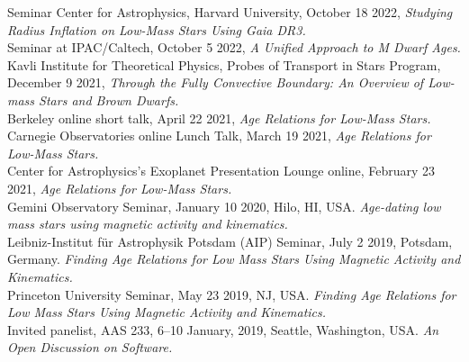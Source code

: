 \documentclass[10pt]{cv}
\begin{document}
\begin{llist}
Seminar Center for Astrophysics, Harvard University, October 18 2022, \textit{Studying Radius Inflation on Low-Mass Stars Using Gaia DR3.}\\
Seminar at IPAC/Caltech, October 5 2022, \textit{A Unified Approach to M Dwarf Ages.}\\
Kavli Institute for Theoretical Physics, Probes of Transport in Stars Program, December 9 2021, \textit{Through the Fully Convective Boundary: An Overview of Low-mass Stars and Brown Dwarfs.}\\
Berkeley online short talk, April 22 2021, \textit{Age Relations for Low-Mass Stars.}\\
Carnegie Observatories online Lunch Talk, March 19 2021, \textit{Age Relations for Low-Mass Stars.}\\
Center for Astrophysics's Exoplanet Presentation Lounge online, February 23 2021, \textit{Age Relations for Low-Mass Stars.}\\ 
Gemini Observatory Seminar, January 10 2020, Hilo, HI, USA. \textit{Age-dating low mass stars using magnetic activity and kinematics.}\\
Leibniz-Institut f\"{u}r Astrophysik Potsdam (AIP) Seminar, July 2 2019, Potsdam, Germany. \textit{Finding Age Relations for Low Mass Stars Using Magnetic Activity and Kinematics.}\\
Princeton University Seminar, May 23 2019, NJ, USA. \textit{Finding Age Relations for Low Mass Stars Using Magnetic Activity and Kinematics.} \\
Invited panelist, AAS 233, 6--10 January, 2019, Seattle, Washington, USA. \textit{An Open Discussion on Software.} 



\end{llist}
\end{document}
